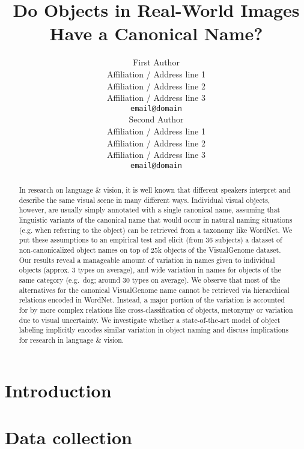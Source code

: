 \documentclass[11pt,a4paper]{article}
\title{Do Objects in Real-World Images Have a Canonical Name?}
\author{First Author \\
  Affiliation / Address line 1 \\
  Affiliation / Address line 2 \\
  Affiliation / Address line 3 \\
  {\tt email@domain} \\\And
  Second Author \\
  Affiliation / Address line 1 \\
  Affiliation / Address line 2 \\
  Affiliation / Address line 3 \\
  {\tt email@domain} \\}
\date{}
\newcommand{\cs}[1]{\textcolor{green}{\emph{//cs: #1//}}}
\begin{document}
\maketitle

\begin{abstract}
In research on language \& vision, it is well known that different speakers interpret and describe the same visual scene in many different ways.
Individual visual objects, however, are usually simply annotated with a single canonical name, assuming that linguistic variants of the canonical name that would occur in natural naming situations (e.g. when referring to the object) can be retrieved from a taxonomy like WordNet.
We put these assumptions to an empirical test and elicit (from 36 subjects) a dataset of non-canonicalized object names on top of 25k objects of the VisualGenome dataset. \\
Our results reveal a manageable amount of variation in names given to individual objects (approx. 3 types on average), and wide variation in names for objects of the same category (e.g.\ dog; around 30 types on average). 
We observe that most of the alternatives for the canonical VisualGenome name cannot be retrieved via hierarchical relations encoded in WordNet. 
Instead, a major portion of the variation is accounted for by more complex relations like cross-classification of objects, metonymy or variation due to visual uncertainty.  
We investigate whether a state-of-the-art model of object labeling implicitly encodes similar variation in object naming and discuss implications for research in language \& vision.
\end{abstract}

\section{Introduction}


%

\section{Data collection}
%
\end{document}
